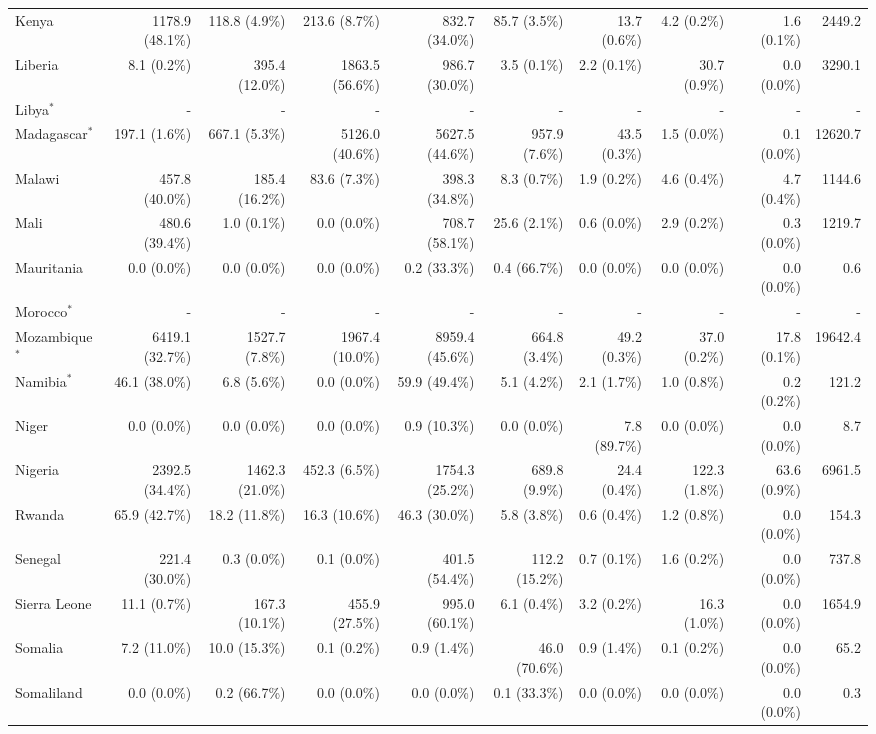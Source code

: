 \begin{scriptsize}
\begin{landscape}
\begin{center}
\begin{longtable}[ht]{lrrrrrrrrr}
			Kenya&1178.9 (48.1\%)&118.8 (4.9\%)&213.6 (8.7\%)&832.7 (34.0\%)&85.7 (3.5\%)&13.7 (0.6\%)&4.2 (0.2\%)&1.6 (0.1\%)&2449.2\\
			Liberia&8.1 (0.2\%)&395.4 (12.0\%)&1863.5 (56.6\%)&986.7 (30.0\%)&3.5 (0.1\%)&2.2 (0.1\%)&30.7 (0.9\%)&0.0 (0.0\%)&3290.1\\
			Libya$^*$&-&-&-&-&-&-&-&-&-\\
			Madagascar$^*$&197.1 (1.6\%)&667.1 (5.3\%)&5126.0 (40.6\%)&5627.5 (44.6\%)&957.9 (7.6\%)&43.5 (0.3\%)&1.5 (0.0\%)&0.1 (0.0\%)&12620.7\\
			Malawi&457.8 (40.0\%)&185.4 (16.2\%)&83.6 (7.3\%)&398.3 (34.8\%)&8.3 (0.7\%)&1.9 (0.2\%)&4.6 (0.4\%)&4.7 (0.4\%)&1144.6\\
			Mali&480.6 (39.4\%)&1.0 (0.1\%)&0.0 (0.0\%)&708.7 (58.1\%)&25.6 (2.1\%)&0.6 (0.0\%)&2.9 (0.2\%)&0.3 (0.0\%)&1219.7\\
			Mauritania&0.0 (0.0\%)&0.0 (0.0\%)&0.0 (0.0\%)&0.2 (33.3\%)&0.4 (66.7\%)&0.0 (0.0\%)&0.0 (0.0\%)&0.0 (0.0\%)&0.6\\
			Morocco$^*$&-&-&-&-&-&-&-&-&-\\
			Mozambique$^*$&6419.1 (32.7\%)&1527.7 (7.8\%)&1967.4 (10.0\%)&8959.4 (45.6\%)&664.8 (3.4\%)&49.2 (0.3\%)&37.0 (0.2\%)&17.8 (0.1\%)&19642.4\\
			Namibia$^*$&46.1 (38.0\%)&6.8 (5.6\%)&0.0 (0.0\%)&59.9 (49.4\%)&5.1 (4.2\%)&2.1 (1.7\%)&1.0 (0.8\%)&0.2 (0.2\%)&121.2\\
			Niger&0.0 (0.0\%)&0.0 (0.0\%)&0.0 (0.0\%)&0.9 (10.3\%)&0.0 (0.0\%)&7.8 (89.7\%)&0.0 (0.0\%)&0.0 (0.0\%)&8.7\\
			Nigeria&2392.5 (34.4\%)&1462.3 (21.0\%)&452.3 (6.5\%)&1754.3 (25.2\%)&689.8 (9.9\%)&24.4 (0.4\%)&122.3 (1.8\%)&63.6 (0.9\%)&6961.5\\
			Rwanda&65.9 (42.7\%)&18.2 (11.8\%)&16.3 (10.6\%)&46.3 (30.0\%)&5.8 (3.8\%)&0.6 (0.4\%)&1.2 (0.8\%)&0.0 (0.0\%)&154.3\\
			Senegal&221.4 (30.0\%)&0.3 (0.0\%)&0.1 (0.0\%)&401.5 (54.4\%)&112.2 (15.2\%)&0.7 (0.1\%)&1.6 (0.2\%)&0.0 (0.0\%)&737.8\\
			Sierra Leone&11.1 (0.7\%)&167.3 (10.1\%)&455.9 (27.5\%)&995.0 (60.1\%)&6.1 (0.4\%)&3.2 (0.2\%)&16.3 (1.0\%)&0.0 (0.0\%)&1654.9\\
			Somalia&7.2 (11.0\%)&10.0 (15.3\%)&0.1 (0.2\%)&0.9 (1.4\%)&46.0 (70.6\%)&0.9 (1.4\%)&0.1 (0.2\%)&0.0 (0.0\%)&65.2\\
			Somaliland&0.0 (0.0\%)&0.2 (66.7\%)&0.0 (0.0\%)&0.0 (0.0\%)&0.1 (33.3\%)&0.0 (0.0\%)&0.0 (0.0\%)&0.0 (0.0\%)&0.3\\

\end{longtable}
\end{center}
\end{landscape}
\end{scriptsize}
